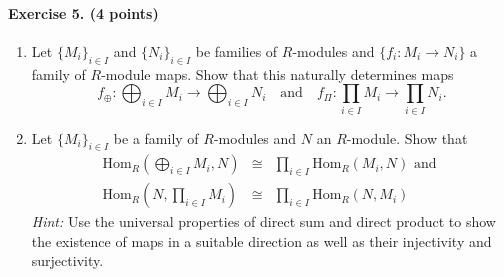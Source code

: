 \documentclass[12pt,a4paper]{article}
\begin{document}
\paragraph{Exercise 5. (4 points)}
\begin{enumerate}
\item Let $\{M_i\}_{i \in  I}$ and $\{N_i\}_{i \in I}$ be families of $R$-modules and $\{ f_i : M_i \rightarrow N_i \}$ a family of $R$-module maps. Show that this naturally determines maps 
\[
f_\oplus : \bigoplus_{i \in I} M_i \rightarrow \bigoplus_{i \in I} N_i \quad \text{and} \quad f_\Pi : \prod_{i \in I} M_i \rightarrow \prod_{i \in I} N_i.
\]
\item Let $\{M_i\}_{i \in I}$ be a family of $R$-modules and $N$ an $R$-module. Show that
\begin{eqnarray*}
\mathrm{Hom}_R\left(\bigoplus_{i\in I} M_i,N \right) &\cong& \prod_{i \in I} \mathrm{Hom}_R \left(M_i,N \right) \text{ and }\\
\mathrm{Hom}_R\left(N,\prod_{i\in I} M_i \right) &\cong& \prod_{i \in I} \mathrm{Hom}_R \left(N,M_i \right)
\end{eqnarray*}
\emph{Hint:} Use the universal properties of direct sum and direct product to show the existence of maps in a suitable direction as well as their injectivity and surjectivity.
\end{enumerate}
\end{document}
